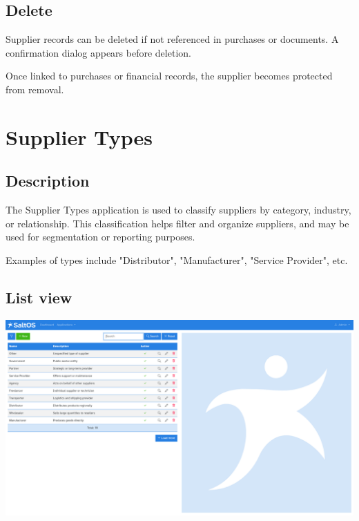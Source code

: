 \documentclass[a4paper]{article}
\begin{document}
\hypertarget{toc130}{}
\subsection{Delete}

Supplier records can be deleted if not referenced in purchases or documents.
A confirmation dialog appears before deletion.

Once linked to purchases or financial records, the supplier becomes protected from removal.


\hypertarget{toc131}{}
\section{Supplier Types}

\hypertarget{toc132}{}
\subsection{Description}

The Supplier Types application is used to classify suppliers by category, industry, or relationship.
This classification helps filter and organize suppliers, and may be used for segmentation or reporting purposes.

Examples of types include "Distributor", "Manufacturer", "Service Provider", etc.

\hypertarget{toc133}{}
\subsection{List view}

\begin{center}\includegraphics[width=1\textwidth]{../ujest/snaps/test-screenshots-js-screenshots-purchases-suppliers-types-list-en-us-1-snap.png}\end{center}
\end{document}
